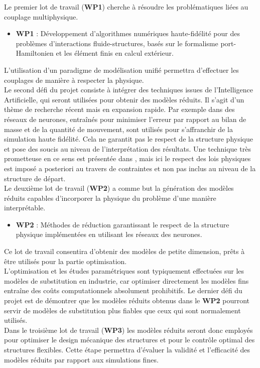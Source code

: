 \documentclass[12pt, french]{article}
\begin{document}
Le premier lot de travail (\textbf{WP1}) cherche à résoudre les problématiques liées au couplage multiphysique. \\

\begin{itemize}
	\item \textbf{WP1} : Développement d'algorithmes numériques haute-fidélité pour des problèmes d'interactions fluide-structures, basés sur le formalisme port-Hamiltonien et les élément finis en calcul extérieur. \\
\end{itemize}

L’utilisation d’un paradigme de modélisation unifié permettra d’effectuer les couplages de manière à respecter la physique.\\

Le second défi du projet consiste à intégrer des techniques issues de l'Intelligence
Artificielle, qui seront utilisées pour obtenir des modèles réduits. Il s'agit d'un thème de recherche récent mais en expansion rapide. Par exemple dans \cite{sun2020physics} des réseaux de neurones, entraînés pour minimiser l'erreur par rapport au bilan de masse et de la quantité de mouvement, sont utilisés pour s'affranchir de la simulation haute fidélité. Cela ne garantit pas le respect de la structure physique et pose des soucis au niveau de l'interprétation des résultats. Une technique très prometteuse en ce sens est présentée dans \cite{lee2020}, mais ici le respect des lois physiques est imposé a posteriori au travers de contraintes et non pas inclus au niveau de la structure de départ. \\
Le deuxième lot de travail (\textbf{WP2}) a comme but la génération des modèles réduits capables d'incorporer la physique du problème d'une manière interprétable.\\

\begin{itemize}
	\item \textbf{WP2} : Méthodes de réduction garantissant le respect de la structure physique implémentées en utilisant les réseaux des neurones.\\
\end{itemize}

Ce lot de travail consentira d'obtenir des modèles de petite dimension, prêts à être utilisés pour la partie optimisation.\\ 

L'optimisation et les études paramétriques sont typiquement effectuées sur les
modèles de substitution en industrie, car optimiser directement les modèles fins entraîne des coûts computationnels absolument prohibitifs. Le dernier défi du projet est de démontrer que les modèles réduits obtenus dans le \textbf{WP2} pourront servir de modèles de substitution plus fiables que ceux qui sont normalement utilisés. \\
Dans le troisième lot de travail (\textbf{WP3}) les modèles réduits seront donc employés pour optimiser le design mécanique des structures et pour le contrôle optimal des structures flexibles. Cette étape permettra d’évaluer la validité et l’efficacité des modèles réduits par rapport aux simulations fines. \\
\end{document}
